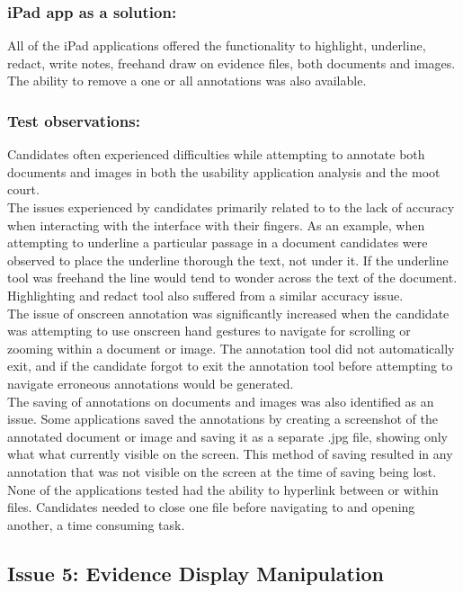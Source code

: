 \subsubsection{iPad app as a solution:}
All of the iPad applications offered the functionality to highlight, underline, redact, write notes, freehand draw on evidence files, both documents and images. The ability to remove a one or all annotations was also available.
\\
\subsubsection{Test observations:}
Candidates often experienced difficulties while attempting to annotate both documents and images in both the usability application analysis and the moot court.\\
The issues experienced by candidates primarily related to to the lack of accuracy when interacting with the interface with their fingers. As an example, when attempting to underline a particular passage in a document candidates were observed to place the underline thorough the text, not under it. If the underline tool was freehand the line would tend to wonder across the text of the document. Highlighting and redact tool also suffered from a similar accuracy issue.\\
The issue of onscreen annotation was significantly increased when the candidate was attempting to use onscreen hand gestures to navigate for scrolling or zooming within a document or image. The annotation tool did not automatically exit, and if the candidate forgot to exit the annotation tool before attempting to navigate erroneous annotations  would be generated.\\
The saving of annotations on documents and images was also identified as an issue. Some applications saved the annotations by creating a screenshot of the annotated document or image and saving it as a separate .jpg file, showing only what what currently visible on the screen. This method of saving resulted in any annotation that was not visible on the screen at the time of saving being lost.
None of the applications tested had the ability to hyperlink between or within files. Candidates needed to close one file before navigating to and opening another, a time consuming task.


\subsection{Issue 5: Evidence Display Manipulation}
